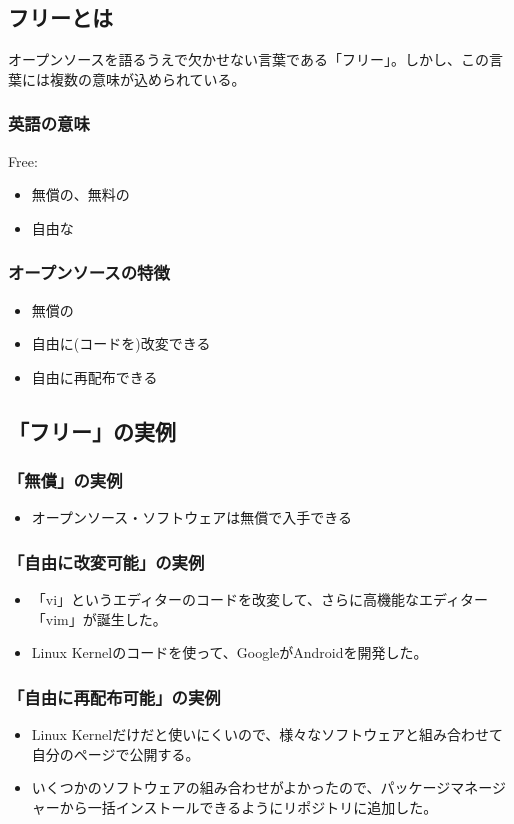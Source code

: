 \documentclass{ltjsarticle}
\begin{document}
\subsection{フリーとは}
オープンソースを語るうえで欠かせない言葉である「フリー」。しかし、この言葉には複数の意味が込められている。
\subsubsection{英語の意味}
Free:
\begin{itemize}
    \item 無償の、無料の
    \item 自由な
\end{itemize}
\subsubsection{オープンソースの特徴}
\begin{itemize}
    \item 無償の
    \item 自由に(コードを)改変できる
    \item 自由に再配布できる
\end{itemize}
\subsection{「フリー」の実例}
\subsubsection{「無償」の実例}
\begin{itemize}
    \item オープンソース・ソフトウェアは無償で入手できる
\end{itemize}
\subsubsection{「自由に改変可能」の実例}
\begin{itemize}
    \item 「vi」というエディターのコードを改変して、さらに高機能なエディター「vim」が誕生した。
    \item Linux Kernelのコードを使って、GoogleがAndroidを開発した。
\end{itemize}
\subsubsection{「自由に再配布可能」の実例}
\begin{itemize}
    \item Linux Kernelだけだと使いにくいので、様々なソフトウェアと組み合わせて自分のページで公開する。
    \item いくつかのソフトウェアの組み合わせがよかったので、パッケージマネージャーから一括インストールできるようにリポジトリに追加した。
\end{itemize}
\end{document}
